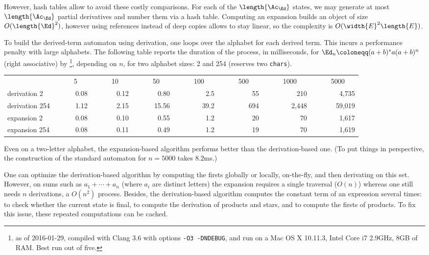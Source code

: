 \documentclass[a4paper,USenglish]{lipics}
\begin{document}
However, hash tables allow to avoid these costly comparisons.  For each of
the $\length{\Ac_\Ed}$ states, we may generate at most $\length{\Ac_\Ed}$
partial derivatives and number them via a hash table.  Computing an
expansion builds an object of size $O(\length{\Ed}^2)$, however using
references instead of deep copies allows to stay linear, so the complexity
is $O(\width{E}^2\length{E})$.

\smallskip
To build the derived-term automaton using derivation, one loops over the
alphabet for each derived term.  This incurs a performance penalty with
large alphabets.
The following table reports the duration of the process, in milliseconds,
for $\Ed_n \coloneqq (a+b)^*a(a+b)^n$ (right associative) by
\vcsn\footnote{ as of 2016-01-29, compiled with Clang 3.6 with
  options \texttt{-O3 -DNDEBUG}, and run on a Mac OS X 10.11.3, Intel Core
  i7 2.9GHz, 8GB of RAM.  Best run out of five.}, depending on $n$, for two
alphabet sizes: 2 and 254 (\vcsn reserves two \texttt{chars}).

\smallskip
\noindent
\newcommand{\T}[1]{\multicolumn{1}{c}{~~~~~#1~~~}}
\begin{tabular}{l@{~~~}d{2}d{2}d{1}d{1}d{0}d{0}d{0}}
{}             & \T{5} & \T{10} & \T{50} & \T{100} & \T{500} & \T{1000} & \T{5000} \\
  derivation 2   & 0.08  & 0.12   & 0.80   & 2.5     & 55      & 210      & 4,735    \\
  derivation 254 & 1.12  & 2.15   & 15.56  & 39.2    & 694     & 2,448    & 59,019   \\
  expansion 2    & 0.08  & 0.10   & 0.55   & 1.2     & 20      & 70       & 1,617    \\
  expansion 254  & 0.08  & 0.11   & 0.49   & 1.2     & 19      & 70       & 1,619    \\
\end{tabular}
\vspace*{.2\baselineskip}

Even on a two-letter alphabet, the expansion-based algorithm performs better
than the derivation-based one. (To put things in perspective, the
construction of the standard automaton for $n = 5000$ takes $8.2$ms.)


One can optimize the derivation-based algorithm by computing the firsts
globally \citep{owens.2009.jfp} or locally, on-the-fly, and then derivating
on this set.  However, on sums such as $a_1+\cdots+a_n$ (where $a_i$ are
distinct letters) the expansion requires a single traversal ($O(n)$) whereas
one still needs $n$ derivations, a $O(n^2)$ process.
Besides, the derivation-based algorithm computes the constant term of an
expression several times: to check whether the current state is final, to
compute the derivation of products and stars, and to compute the firsts of
products.  To fix this issue, these repeated computations can be cached.
\end{document}
